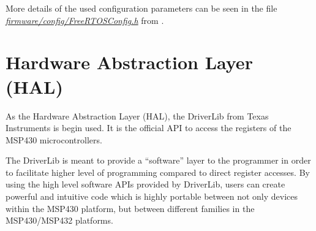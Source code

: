 More details of the used configuration parameters can be seen in the file \textit{\href{https://github.com/spacelab-ufsc/eps2/blob/master/firmware/config/FreeRTOSConfig.h}{firmware/config/FreeRTOSConfig.h}} from \cite{eps2}.

\section{Hardware Abstraction Layer (HAL)}

As the Hardware Abstraction Layer (HAL), the DriverLib \cite{driverlib} from Texas Instruments is begin used. It is the official API to access the registers of the MSP430 microcontrollers.

The DriverLib is meant to provide a ``software'' layer to the programmer in order to facilitate higher level of programming compared to direct register accesses. By using the high level software APIs provided by DriverLib, users can create powerful and intuitive code which is highly portable between not only devices within the MSP430 platform, but between different families in the MSP430/MSP432 platforms.
